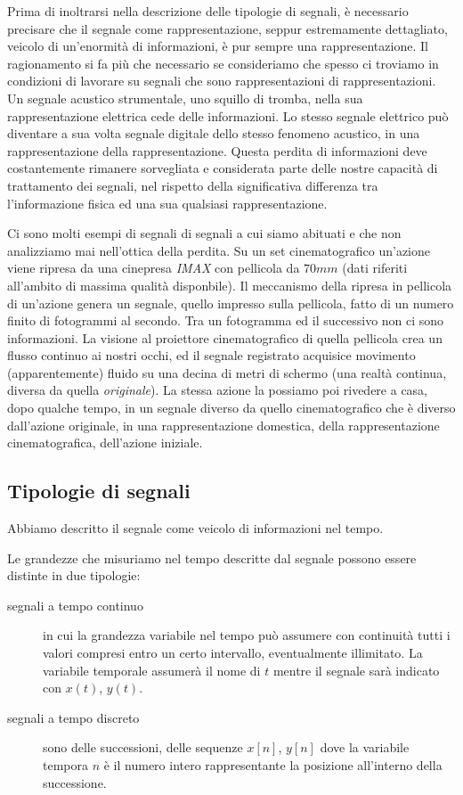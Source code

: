 Prima di inoltrarsi nella descrizione delle tipologie di segnali, è necessario
precisare che il segnale come rappresentazione, seppur estremamente dettagliato,
veicolo di un'enormità di informazioni, è pur sempre una rappresentazione. Il
ragionamento si fa più che necessario se consideriamo che spesso ci troviamo in
condizioni di lavorare su segnali che sono rappresentazioni di rappresentazioni.
Un segnale acustico strumentale, uno squillo di tromba, nella sua rappresentazione
elettrica cede delle informazioni. Lo stesso segnale elettrico può diventare a
sua volta segnale digitale dello stesso fenomeno acustico, in una rappresentazione
della rappresentazione. Questa perdita di informazioni deve costantemente rimanere
sorvegliata e considerata parte delle nostre capacità di trattamento dei segnali,
nel rispetto della significativa differenza tra l'informazione fisica ed una sua
qualsiasi rappresentazione.

Ci sono molti esempi di segnali di segnali a cui siamo abituati e che non analizziamo
mai nell'ottica della perdita. Su un set cinematografico un'azione viene ripresa
da una cinepresa \emph{IMAX} con pellicola da $70mm$ (dati riferiti all'ambito
di massima qualità disponbile). Il meccanismo della ripresa in pellicola di
un'azione genera un segnale, quello impresso sulla pellicola, fatto di un numero
finito di fotogrammi al secondo. Tra un fotogramma ed il successivo non ci sono
informazioni. La visione al proiettore cinematografico di quella pellicola crea
un flusso continuo ai nostri occhi, ed il segnale registrato acquisice movimento
(apparentemente) fluido su una decina di metri di schermo (una realtà continua,
diversa da quella \emph{originale}). La stessa azione la possiamo poi rivedere a
casa, dopo qualche tempo, in un segnale diverso da quello cinematografico che
è diverso dall'azione originale, in una rappresentazione domestica, della
rappresentazione cinematografica, dell'azione iniziale.

\subsection{Tipologie di segnali}

Abbiamo descritto il segnale come veicolo di informazioni nel tempo.

Le grandezze che misuriamo nel tempo descritte dal segnale possono essere
distinte in due tipologie:

\begin{description}
  \item[segnali a tempo continuo] in cui la grandezza variabile nel tempo può
  assumere con continuità tutti i valori compresi entro un certo intervallo,
  eventualmente illimitato. La variabile temporale assumerà il nome di $t$ mentre
  il segnale sarà indicato con $x(t)$, $y(t)$.
  \item[segnali a tempo discreto] sono delle successioni, delle sequenze $x[n]$,
  $y[n]$ dove la variabile tempora $n$ è il numero intero rappresentante la posizione
  all'interno della successione.
\end{description}

